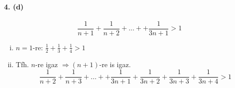 \documentclass[12pt,a4paper,fleqn]{article}
\newcommand{\myparagraph}[1]{\paragraph{#1}\mbox{}}
\begin{document}
\myparagraph{4. (d)}
\[ \dfrac{1}{n+1} + \dfrac{1}{n+2} + ... + + \dfrac{1}{3n+1} > 1 \]
\begin{enumerate}[i.]
  \item $n=1$-re: $\frac{1}{2} + \frac{1}{3} + \frac{1}{4} > 1 $ \checkmark
  \item Tfh. $n$-re igaz $\Rightarrow (n+1)$-re is igaz.
  \[ \dfrac{1}{n+2} + \dfrac{1}{n+3} + ... + + \dfrac{1}{3n+1} + \dfrac{1}{3n+2} + \dfrac{1}{3n+3} + \dfrac{1}{3n+4} > 1 \]

\end{enumerate}

\clearpage
\tableofcontents
\end{document}
